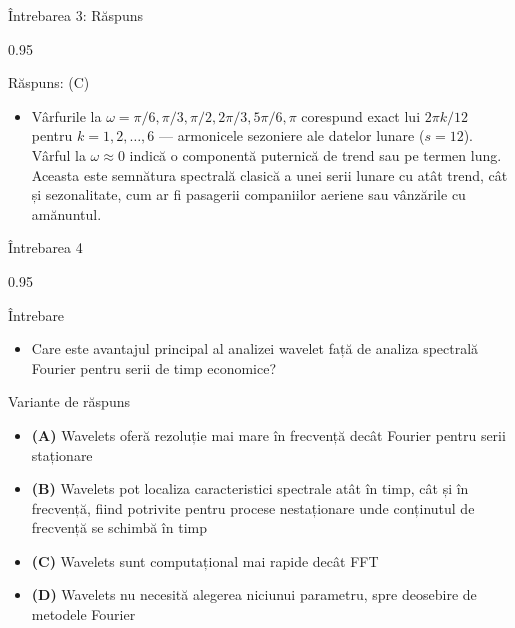 \documentclass[9pt, aspectratio=169, t]{beamer}
\begin{document}
\begin{frame}{Întrebarea 3: Răspuns}
    \begin{cminipage}{0.95\textwidth}
    \vspace{-0.3cm}
    {\small
    \begin{exampleblock}{Răspuns: (C)}
    \begin{itemize}\setlength{\itemsep}{0pt}
        \item Vârfurile la $\omega = \pi/6, \pi/3, \pi/2, 2\pi/3, 5\pi/6, \pi$ corespund exact lui $2\pi k/12$ pentru $k = 1, 2, \ldots, 6$ --- armonicele sezoniere ale datelor lunare ($s = 12$). Vârful la $\omega \approx 0$ indică o componentă puternică de trend sau pe termen lung. Aceasta este semnătura spectrală clasică a unei serii lunare cu atât trend, cât și sezonalitate, cum ar fi pasagerii companiilor aeriene sau vânzările cu amănuntul.
    \end{itemize}
    \end{exampleblock}
    }
    \hfill{}
    \end{cminipage}
\end{frame}

\begin{frame}{Întrebarea 4}
    \begin{cminipage}{0.95\textwidth}
    \begin{alertblock}{Întrebare}
        \begin{itemize}\setlength{\itemsep}{0pt}
            \item Care este avantajul principal al analizei wavelet față de analiza spectrală Fourier pentru serii de timp economice?
        \end{itemize}
    \end{alertblock}

    \vspace{0.3cm}

    \begin{block}{Variante de răspuns}
        \begin{itemize}\setlength{\itemsep}{2pt}
            \item \textcolor{MainBlue}{\textbf{(A)}} Wavelets oferă rezoluție mai mare în frecvență decât Fourier pentru serii staționare
            \item \textcolor{MainBlue}{\textbf{(B)}} Wavelets pot localiza caracteristici spectrale atât în timp, cât și în frecvență, fiind potrivite pentru procese nestaționare unde conținutul de frecvență se schimbă în timp
            \item \textcolor{MainBlue}{\textbf{(C)}} Wavelets sunt computațional mai rapide decât FFT
            \item \textcolor{MainBlue}{\textbf{(D)}} Wavelets nu necesită alegerea niciunui parametru, spre deosebire de metodele Fourier
        \end{itemize}
    \end{block}
    \end{cminipage}
\end{frame}
\end{document}
